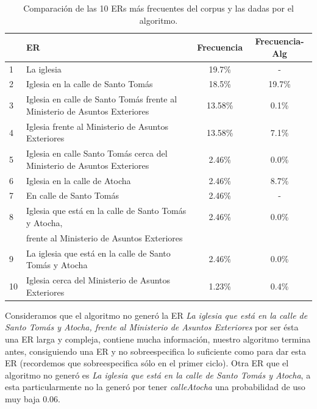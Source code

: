 \begin{table}[H]
{\footnotesize
\begin{center}
\begin{tabular}{|l|l|c|c|}
\hline
&ER 					      &  Frecuencia & Frecuencia-Alg\\ \hline \hline
1&La iglesia 								 &19.7\%  &  -\\ \hline
2&Iglesia en la calle de Santo Tom\'as						 &18.5\% 	& 19.7\%  \\ \hline
3&Iglesia en calle de Santo Tom\'as frente al Ministerio de Asuntos Exteriores        &13.58\% & 0.1\% \\ \hline
4&Iglesia frente al Ministerio de Asuntos Exteriores 			 &13.58\% & 7.1\%  \\ \hline
5&Iglesia en calle Santo Tom\'as cerca del Ministerio de Asuntos Exteriores        &2.46\% & 0.0\%  \\ \hline
6&Iglesia en la calle de Atocha							&2.46\%  &8.7\%  \\ \hline
7&En calle de Santo Tom\'as 							&2.46\% 	& -  \\ \hline
8&Iglesia que est\'a en la calle de Santo Tom\'as y Atocha, 	 &2.46\%	& 0.0\% \\ 
&frente al Ministerio de Asuntos Exteriores						 && \\ \hline
9&La iglesia que est\'a en la calle de Santo Tom\'as y Atocha			 &2.46\% 	& 0.0\%  \\ \hline
10&Iglesia cerca del Ministerio de Asuntos Exteriores				 &1.23\% 	&0.4\%  \\ \hline
\end{tabular}
\caption{Comparaci\'on de las 10 ERs m\'as frecuentes del corpus y las dadas por el algoritmo.}\label{compara-corpus-alg}
\end{center}
}
\end{table}



Consideramos que el algoritmo no gener\'o la ER {\it La iglesia que est\'a en la calle de Santo Tom\'as y Atocha, frente al Ministerio de Asuntos Exteriores} por ser \'esta una ER larga y compleja, contiene mucha informaci\'on, nuestro algoritmo termina antes, consiguiendo una ER y no sobreespecifica lo suficiente como para dar esta ER (recordemos que sobreespecifica s\'olo en el primer ciclo). Otra ER que el algoritmo no gener\'o es {\it La iglesia que est\'a en la calle de Santo Tom\'as y Atocha}, a esta particularmente no la gener\'o por tener {\it calleAtocha} una probabilidad de uso muy baja 0.06.

